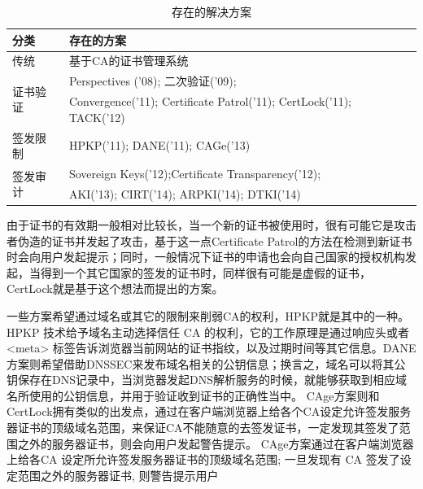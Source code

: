 \renewcommand\arraystretch{2}
\begin{table}[h]
\centering
\begin{tabular}{p{2.5cm}p{12cm}}
	\hline
	分类 & 存在的方案 \\
	\hline
	传统 & \small 基于CA的证书管理系统 \\
	\hline
	\multirow{2}{*}{证书验证} & \small Perspectives ('08)\parencite{wendlandt2008perspectives}; 二次验证('09)\parencite{alicherry2009doublecheck};   \\ \cline{2-2}
	& \small Convergence('11)\parencite{convergence}; Certificate Patrol('11)\parencite{modell2014certificate}; CertLock('11)\parencite{soghoian2011certified}; TACK('12)\parencite{marlinspike2012internet} \\
	\hline
	签发限制 & \small HPKP('11)\parencite{evans2015public}; DANE('11)\parencite{barnes2011dane}; CAGe('13)\parencite{kasten2013cage} \\
	\hline
	\multirow{2}{*}{签发审计} & \small Sovereign Keys('12)\parencite{eckersley2012internet};Certificate Transparency('12)\parencite{laurie2013certificate}; \\ \cline{2-2}
	& \small AKI('13)\parencite{kim2013accountable}; CIRT('14)\parencite{ryan2014enhanced}; ARPKI('14)\parencite{basin2014arpki}; DTKI('14)\parencite{cheval2014dtki}	 \\
	\hline
	
\end{tabular}
\caption{存在的解决方案}\label{proposed} %
\end{table}

由于证书的有效期一般相对比较长，当一个新的证书被使用时，很有可能它是攻击者伪造的证书并发起了攻击，基于这一点Certificate Patrol\cite{modell2014certificate}的方法在检测到新证书时会向用户发起提示；同时，一般情况下证书的申请也会向自己国家的授权机构发起，当得到一个其它国家的签发的证书时，同样很有可能是虚假的证书，CertLock\cite{soghoian2011certified}就是基于这个想法而提出的方案。%



一些方案希望通过域名或其它的限制来削弱CA的权利，HPKP\cite{evans2015public}就是其中的一种。HPKP 技术给予域名主动选择信任 CA 的权利，它的工作原理是通过响应头或者 <meta> 标签告诉浏览器当前网站的证书指纹，以及过期时间等其它信息。DANE\cite{barnes2011dane}方案则希望借助DNSSEC来发布域名相关的公钥信息；换言之，域名可以将其公钥保存在DNS记录中，当浏览器发起DNS解析服务的时候，就能够获取到相应域名所使用的公钥信息，并用于验证收到证书的正确性当中。
CAge方案则和CertLock拥有类似的出发点，通过在客户端浏览器上给各个CA设定允许签发服务器证书的顶级域名范围，来保证CA不能随意的去签发证书，一定发现其签发了范围之外的服务器证书，则会向用户发起警告提示。
CAge方案通过在客户端浏览器上给各CA 设定所允许签发服务器证书的顶级域名范围; 一旦发现有 CA 签发了设定范围之外的服务器证书, 则警告提示用户

